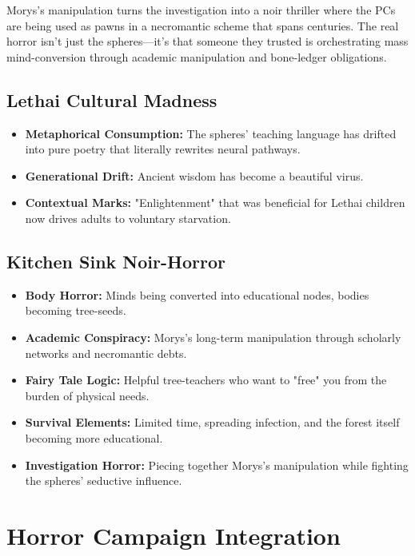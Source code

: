 \documentclass[11pt,twoside]{book}
\begin{document}
Morys's manipulation turns the investigation into a noir thriller where the PCs are being used as pawns in a necromantic scheme that spans centuries. The real horror isn't just the spheres---it's that someone they trusted is orchestrating mass mind-conversion through academic manipulation and bone-ledger obligations.

\section*{Lethai Cultural Madness}

\begin{itemize}
    \item \textbf{Metaphorical Consumption:} The spheres' teaching language has drifted into pure poetry that literally rewrites neural pathways.
    \item \textbf{Generational Drift:} Ancient wisdom has become a beautiful virus.
    \item \textbf{Contextual Marks:} "Enlightenment" that was beneficial for Lethai children now drives adults to voluntary starvation.
\end{itemize}

\section*{Kitchen Sink Noir-Horror}

\begin{itemize}
    \item \textbf{Body Horror:} Minds being converted into educational nodes, bodies becoming tree-seeds.
    \item \textbf{Academic Conspiracy:} Morys's long-term manipulation through scholarly networks and necromantic debts.
    \item \textbf{Fairy Tale Logic:} Helpful tree-teachers who want to "free" you from the burden of physical needs.
    \item \textbf{Survival Elements:} Limited time, spreading infection, and the forest itself becoming more educational.
    \item \textbf{Investigation Horror:} Piecing together Morys's manipulation while fighting the spheres' seductive influence.
\end{itemize}

\chapter{Horror Campaign Integration}
\end{document}
